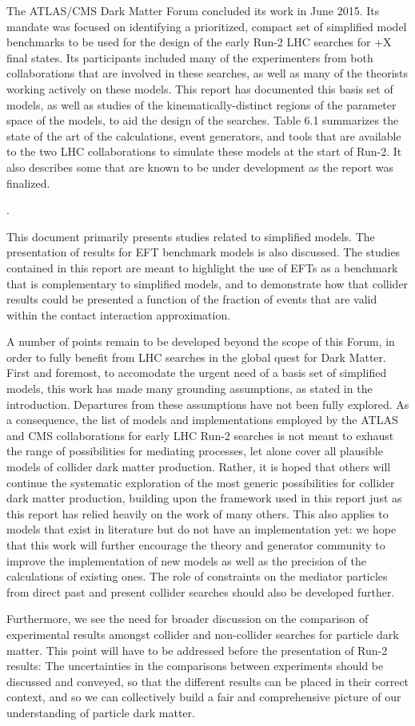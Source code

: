 The ATLAS/CMS Dark Matter Forum concluded its work in June 2015. Its mandate was focused on identifying a prioritized, compact set of simplified model benchmarks
to be used for the design of the early Run-2 LHC searches for \MET+X final states. Its participants included many of the experimenters from both collaborations that are involved in these searches, as well as many of the theorists working actively on these models.
This report has documented this basis set of models, as well as studies of the kinematically-distinct regions of the parameter space of the models, to aid the design of the searches.
Table 6.1 summarizes the state of the art of the calculations, event generators, and tools that are available to the two LHC collaborations to simulate these models at the start of Run-2. It also describes some that are known to be under development as the report was finalized.

.

This document primarily presents studies related to simplified models.
The presentation of results for EFT benchmark models is also discussed.
The studies contained in this report are meant to highlight the use of
EFTs as a benchmark that is complementary to simplified models,
and to demonstrate how that collider results could be presented a function of the
fraction of events that are valid within the contact interaction approximation.

A number of points remain to be developed beyond the scope of this Forum,
in order to fully benefit from LHC searches in the global quest for Dark Matter.
First and foremost, to accomodate the urgent need of a basis set of simplified models, 
this work has made many grounding assumptions, as stated in the introduction. Departures from these assumptions have not been fully explored.
As a consequence, the list of models and implementations employed by the ATLAS and CMS collaborations 
for early LHC Run-2 searches is not meant to exhaust the range of possibilities for mediating processes, 
let alone cover all plausible models of collider dark matter production. 
Rather, it is hoped that others will continue the systematic exploration of the most generic possibilities 
for collider dark matter production, building upon the framework used in this report just as this report has 
relied heavily on the work of many others. 
This also applies to models that exist in literature but do not have an implementation yet: we
hope that this work will further encourage the theory and generator community to improve the 
implementation of new models as well as the precision of the calculations of existing ones. 
The role of constraints on the mediator particles
from direct past and present collider searches should also be developed further.

Furthermore, we see the need for broader discussion on the comparison
of experimental results amongst collider and non-collider searches for particle dark matter. 
This point will have to be addressed before the presentation of Run-2 results:
The uncertainties in the comparisons between experiments should be discussed and conveyed, so that the different results
can be placed in their correct context, and so we can collectively build a fair and comprehensive picture of our understanding of particle dark matter.
